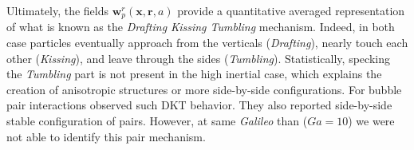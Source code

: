 Ultimately, the fields $\textbf{w}^r_p(\textbf{x},\textbf{r}, a)$ provide a quantitative averaged representation of what is known as the \textit{Drafting Kissing Tumbling} \citep{fortes1987nonlinear} mechanism. 
Indeed, in both case particles eventually approach from the verticals (\textit{Drafting}), nearly touch each other (\textit{Kissing}), and leave through the sides (\textit{Tumbling}). 
Statistically, specking the \textit{Tumbling} part is not present in the high inertial case, which explains the creation of anisotropic structures or more side-by-side configurations. 
For bubble pair interactions \citet{zhang2021three} observed such DKT behavior.
They also reported side-by-side stable configuration of pairs. 
However, at same \textit{Galileo} than  \citet{zhang2021three} ($Ga = 10$) we were not able to identify this pair mechanism. 

